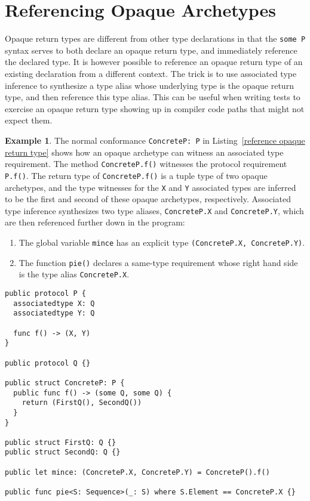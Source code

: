 \documentclass[a4paper,headsepline,bibliography=totoc,toc=flat,fleqn,twoside=semi]{scrbook}
\theoremstyle{definition}
\theoremstyle{definition}
\newtheorem{example}{Example}[chapter]
\theoremstyle{definition}
\newcommand{\ifWIP}{\iffalse}
\begin{document}
\fi

\section{Referencing Opaque Archetypes}\label{reference opaque archetype}

\ifWIP

Opaque return types are different from other type declarations in that the \texttt{some P} syntax serves to both declare an opaque return type, and immediately reference the declared type. It is however possible to reference an opaque return type of an existing declaration from a different context. The trick is to use associated type inference to synthesize a type alias whose underlying type is the opaque return type, and then reference this type alias. This can be useful when writing tests to exercise an opaque return type showing up in compiler code paths that might not expect them.

\begin{example} The normal conformance \texttt{ConcreteP:\ P} in Listing~\ref{reference opaque return type} shows how an opaque archetype can witness an associated type requirement. The method \texttt{ConcreteP.f()} witnesses the protocol requirement \texttt{P.f()}. The return type of \texttt{ConcreteP.f()} is a tuple type of two opaque archetypes, and the type witnesses for the \texttt{X} and \texttt{Y} associated types are inferred to be the first and second of these opaque archetypes, respectively. Associated type inference synthesizes two type aliases, \texttt{ConcreteP.X} and \texttt{ConcreteP.Y}, which are then referenced further down in the program:
\begin{enumerate}
\item The global variable \texttt{mince} has an explicit type \texttt{(ConcreteP.X,~ConcreteP.Y)}.
\item The function \texttt{pie()} declares a same-type requirement whose right hand side is the type alias \texttt{ConcreteP.X}.
\end{enumerate}

\begin{listing}\label{reference opaque return type}
\begin{Verbatim}
public protocol P {
  associatedtype X: Q
  associatedtype Y: Q
  
  func f() -> (X, Y)
}

public protocol Q {}

public struct ConcreteP: P {
  public func f() -> (some Q, some Q) {
    return (FirstQ(), SecondQ())
  }
}

public struct FirstQ: Q {}
public struct SecondQ: Q {}

public let mince: (ConcreteP.X, ConcreteP.Y) = ConcreteP().f()

public func pie<S: Sequence>(_: S) where S.Element == ConcreteP.X {}
\end{Verbatim}
\end{listing}
\end{example}
\end{document}
